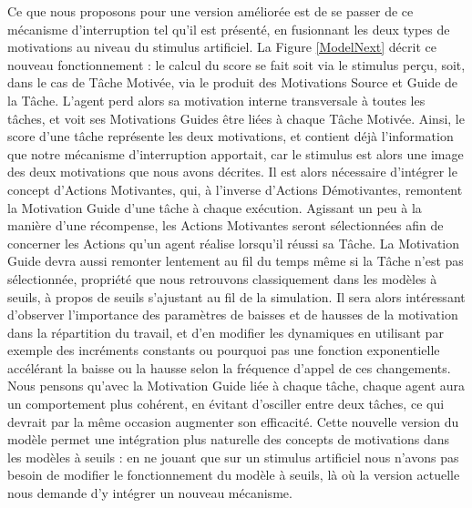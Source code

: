	Ce que nous proposons pour une version améliorée est de se passer de ce mécanisme d'interruption tel qu'il est présenté, en fusionnant les deux types de motivations au niveau du stimulus artificiel. La Figure \ref{ModelNext} décrit ce nouveau fonctionnement : le calcul du score se fait soit via le stimulus perçu, soit, dans le cas de Tâche Motivée, via le produit des Motivations Source et Guide de la Tâche. L'agent perd alors sa motivation interne transversale à toutes les tâches, et voit ses Motivations Guides être liées à chaque Tâche Motivée. Ainsi, le score d'une tâche représente les deux motivations, et contient déjà l'information que notre mécanisme d'interruption apportait, car le stimulus est alors une image des deux motivations que nous avons décrites. Il est alors nécessaire d'intégrer le concept d'Actions Motivantes, qui, à l'inverse d'Actions Démotivantes, remontent la Motivation Guide d'une tâche à chaque exécution. Agissant un peu à la manière d'une récompense, les Actions Motivantes seront sélectionnées afin de concerner les Actions qu'un agent réalise lorsqu'il réussi sa Tâche. La Motivation Guide devra aussi remonter lentement au fil du temps même si la Tâche n'est pas sélectionnée, propriété que nous retrouvons classiquement dans les modèles à seuils, à propos de seuils s'ajustant au fil de la simulation. Il sera alors intéressant d'observer l'importance des paramètres de baisses et de hausses de la motivation dans la répartition du travail, et d'en modifier les dynamiques en utilisant par exemple des incréments constants ou pourquoi pas une fonction exponentielle accélérant la baisse ou la hausse selon la fréquence d'appel de ces changements. Nous pensons qu'avec la Motivation Guide liée à chaque tâche, chaque agent aura un comportement plus cohérent, en évitant d'osciller entre deux tâches, ce qui devrait par la même occasion augmenter son efficacité. Cette nouvelle version du modèle permet une intégration plus naturelle des concepts de motivations dans les modèles à seuils : en ne jouant que sur un stimulus artificiel nous n'avons pas besoin de modifier le fonctionnement du modèle à seuils, là où la version actuelle nous demande d'y intégrer un nouveau mécanisme.
	
